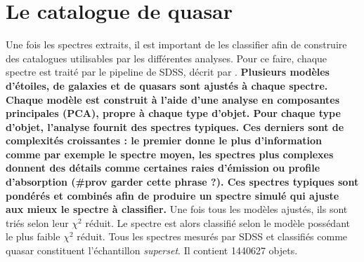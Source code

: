 \documentclass[11pt, twoside, a4paper, openright]{report}
\begin{document}
\section{Le catalogue de quasar}
Une fois les spectres extraits, il est important de les classifier afin de construire des catalogues utilisables par les différentes analyses. Pour ce faire, chaque spectre est traité par le pipeline de SDSS, décrit par \citet{bolton_spectral_2012}.
\textbf{Plusieurs modèles d'étoiles, de galaxies et de quasars sont ajustés à chaque spectre.
Chaque modèle est construit à l'aide d'une analyse en composantes principales (PCA), propre à chaque type d'objet. Pour chaque type d'objet, l'analyse fournit des spectres typiques. Ces derniers sont de complexités croissantes : le premier donne le plus d'information comme par exemple le spectre moyen, les spectres plus complexes donnent des détails comme certaines raies d'émission ou profile d'absorption (\#prov garder cette phrase ?). Ces spectres typiques sont pondérés et combinés afin de produire un spectre simulé qui ajuste aux mieux le spectre à classifier.}
Une fois tous les modèles ajustés, ils sont triés selon leur $\chi^{2}$ réduit. Le spectre est alors classifié selon le modèle possédant le plus faible $\chi^{2}$ réduit.
Tous les spectres mesurés par SDSS et classifiés comme quasar constituent l'échantillon \emph{superset}. Il contient \num{1440627} objets.
\end{document}
